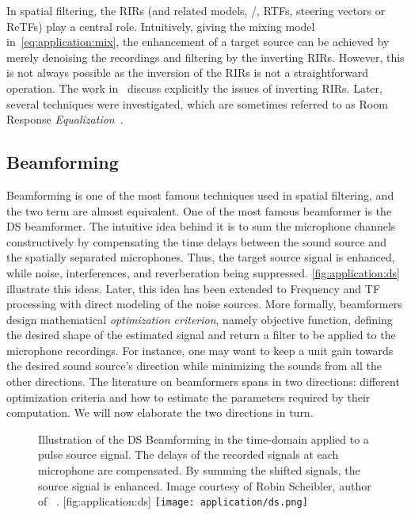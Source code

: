 \mynewline
In spatial filtering, the \acp{RIR} (and related models, \eg/, \acp{RTF}, steering vectors or \acp{ReTF}) play a central role.
Intuitively, giving the mixing model in~\cref{eq:application:mix}, the enhancement of a target source can be achieved by merely denoising the recordings and filtering by the inverting \acp{RIR}.
However, this is not always possible as the inversion of the \acp{RIR} is not a straightforward operation.
The work in~ discuss explicitly the issues of inverting \acp{RIR}.
Later, several techniques were investigated, which are sometimes referred to as Room Response \textit{Equalization}~.


\subsection{Beamforming}
Beamforming is one of the most famous techniques used in spatial filtering, and the two term are almost equivalent.
One of the most famous beamformer is the \ac{DS} beamformer.
The intuitive idea behind it is to sum the microphone channels constructively by compensating the time delays between the sound source and the spatially separated microphones.
Thus, the target source signal is enhanced, while noise, interferences, and reverberation being suppressed.
\cref{fig:application:ds} illustrate this ideas.
Later, this idea has been extended to Frequency and \ac{TF} processing with direct modeling of the noise sources.
More formally, beamformers design mathematical \textit{optimization criterion}, namely objective function, defining the desired shape of the estimated signal and return a filter to be applied to the microphone recordings.
For instance, one may want to keep a unit gain towards the desired sound source's direction while minimizing the sounds from all the other directions.
The literature on beamformers spans in two directions: different optimization criteria and how to estimate the parameters required by their computation.
We will now elaborate the two directions in turn.
\begin{figure}
    \begin{sidecaption}[]{
        Illustration of the \ac{DS} Beamforming in the time-domain applied to a pulse source signal.
        The delays of the recorded signals at each microphone are compensated.
        By summing the shifted signals, the source signal is enhanced.
        Image courtesy of Robin Scheibler, author of ~.
    }[fig:application:ds]
        \centering
        \texttt{[image: application/ds.png]}
    \end{sidecaption}
\end{figure}

